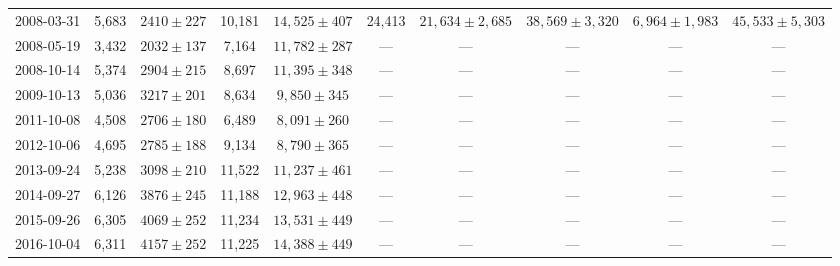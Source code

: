 \begin{landscape}
\begin{longtable}{cccccccccc}
{2008-03-31} & 5,683 & {$2410  \pm  227$} & 10,181 & {$14,525 \pm 407$} & 24,413 & {$21,634 \pm 2,685$} & {$38,569 \pm 3,320$} & {$6,964 \pm 1,983$} & {$45,533 \pm 5,303$} \\
{2008-05-19} & 3,432 & {$2032  \pm  137$} & 7,164 & {$11,782 \pm 287$} & --- & --- & --- & --- & --- \\
{2008-10-14} & 5,374 & {$2904  \pm  215$} & 8,697 & {$11,395 \pm 348$} & --- & --- & --- & --- & --- \\
{2009-10-13} & 5,036 & {$3217  \pm  201$} & 8,634 & {$9,850 \pm 345$} & --- & --- & --- & --- & --- \\
{2011-10-08} & 4,508 & {$2706  \pm  180$} & 6,489 & {$8,091 \pm 260$} & --- & --- & --- & --- & --- \\
{2012-10-06} & 4,695 & {$2785  \pm  188$} & 9,134 & {$8,790 \pm 365$} & --- & --- & --- & --- & --- \\
{2013-09-24} & 5,238 & {$3098  \pm  210$} & 11,522 & {$11,237 \pm 461$} & --- & --- & --- & --- & --- \\
{2014-09-27} & 6,126 & {$3876  \pm  245$} & 11,188 & {$12,963 \pm 448$} & --- & --- & --- & --- & --- \\
{2015-09-26} & 6,305 & {$4069  \pm  252$} & 11,234 & {$13,531 \pm 449$} & --- & --- & --- & --- & --- \\
{2016-10-04} & 6,311 & {$4157  \pm  252$} & 11,225 & {$14,388 \pm 449$} & --- & --- & --- & --- & --- \\
\end{longtable} 
\end{landscape} 
